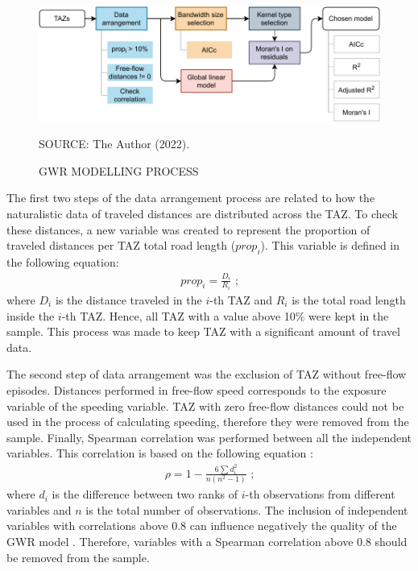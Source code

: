 \begin{figure}[!htbp]
    \centering\footnotesize
    \captionsetup{font=footnotesize}
    \caption{GWR MODELLING PROCESS}
    \includegraphics{fig/gwr-method.pdf}
    \label{fig:gwr-method}
    \par SOURCE: The Author (2022).
\end{figure}

The first two steps of the data arrangement process are related to how the naturalistic data of traveled distances are distributed across the TAZ. To check these distances, a new variable was created to represent the proportion of traveled distances per TAZ total road length ($prop_i$). This variable is defined in the following equation: \begin{align}
    prop_i = \frac{D_i}{R_i} \mbox{ ;}
\end{align} where $D_i$ is the distance traveled in the $i$-th TAZ and $R_i$ is the total road length inside the $i$-th TAZ. Hence, all TAZ with a value above 10\% were kept in the sample. This process was made to keep TAZ with a significant amount of travel data.

The second step of data arrangement was the exclusion of TAZ without free-flow episodes. Distances performed in free-flow speed corresponds to the exposure variable of the speeding variable. TAZ with zero free-flow distances could not be used in the process of calculating speeding, therefore they were removed from the sample. Finally, Spearman correlation was performed between all the independent variables. This correlation is based on the following equation \cite{Dodge2010}: \begin{align}
    \rho = 1 - \frac{6 \sum d_i^2}{n \left( n^2 - 1\right)} \mbox{ ;}
\end{align} where $d_i$ is the difference between two ranks of $i$-th observations from different variables and $n$ is the total number of observations. The inclusion of independent variables with correlations above 0.8 can influence negatively the quality of the GWR model \cite{Gollini2013}. Therefore, variables with a Spearman correlation above 0.8 should be removed from the sample. 

